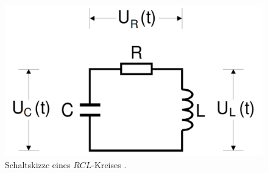 \begin{figure}
\centering
\includegraphics[width=\linewidth-200pt,height=\textheight-200pt,keepaspectratio]{content/images/RCL.png}
\caption{Schaltskizze eines $RCL$-Kreises \cite{V354}.}
\label{fig:RLC_Kreis}
\end{figure}
 

